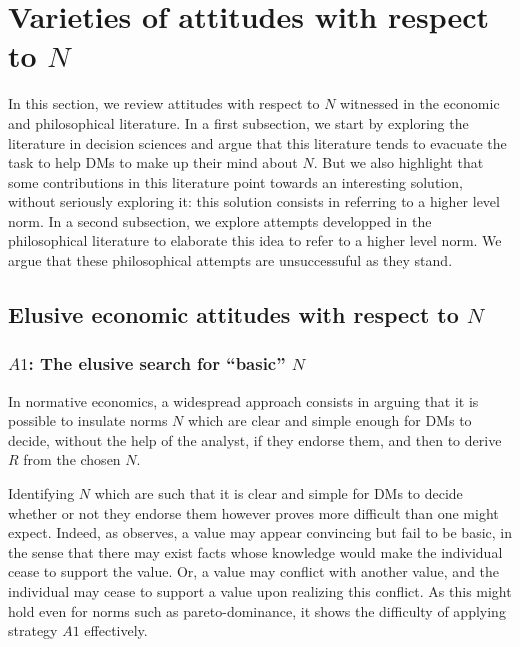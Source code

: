 \documentclass[preprint, french, english, 11pt, authoryear]{elsarticle}%
\newcommand{\protectforpdf}[1]{\texorpdfstring{\ensuremath{#1}}{#1}}
\begin{document}
\section{Varieties of attitudes with respect to \protectforpdf{N}}
\label{sec:existing}
In this section, we review attitudes with respect to $N$ witnessed in the economic and philosophical literature. In a first subsection, we start by exploring the literature in decision sciences and argue that this literature tends to evacuate the task to help \acp{DM} to make up their mind about $N$. But we also highlight that some contributions in this literature point towards an interesting solution, without seriously exploring it: this solution consists in referring to a higher level norm. In a second subsection, we explore attempts developped in the philosophical literature to elaborate this idea to refer to a higher level norm. We argue that these philosophical attempts are unsuccessuful as they stand.

\subsection{Elusive economic attitudes with respect to \protectforpdf{N}}
\subsubsection{\protectforpdf{A1}: The elusive search for ``basic'' \protectforpdf{N}}

In normative economics, a widespread approach consists in arguing that it is possible to insulate norms $N$ which are clear and simple enough for \acp{DM} to decide, without the help of the analyst, if they endorse them, and then to derive $R$ from the chosen $N$.

Identifying $N$ which are such that it is clear and simple for \acp{DM} to decide whether or not they endorse them however proves more difficult than one might expect. Indeed, as \citet{sen_nature_1967} observes, a value may appear convincing but fail to be basic, in the sense that there may exist facts whose knowledge would make the individual cease to support the value. Or, a value may conflict with another value, and the individual may cease to support a value upon realizing this conflict. As this might hold even for norms such as pareto-dominance, it shows the difficulty of applying strategy $A1$ effectively.
\end{document}
